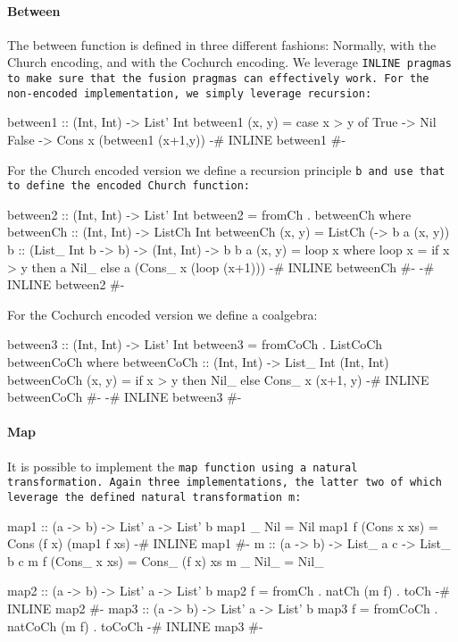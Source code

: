 \paragraph{Between}
The between function is defined in three different fashions: Normally, with the Church encoding, and with the Cochurch encoding.
We leverage \tt{INLINE} pragmas to make sure that the fusion pragmas can effectively work.
For the non-encoded implementation, we simply leverage recursion:
\begin{code}
between1 :: (Int, Int) -> List' Int
between1 (x, y) = case x > y of
  True  -> Nil
  False -> Cons x (between1 (x+1,y))
{-# INLINE between1 #-}
\end{code}
For the Church encoded version we define a recursion principle \tt{b} and use that to define the encoded Church function:
\begin{code}
between2 :: (Int, Int) -> List' Int
between2 = fromCh . betweenCh
  where betweenCh :: (Int, Int) -> ListCh Int
        betweenCh (x, y) = ListCh (\a -> b a (x, y))
        b :: (List_ Int b -> b) -> (Int, Int) -> b
        b a (x, y) = loop x
          where loop x = if x > y
                         then a Nil_
                         else a (Cons_ x (loop (x+1)))
        {-# INLINE betweenCh #-}
{-# INLINE between2 #-}
\end{code}
For the Cochurch encoded version we define a coalgebra:
\begin{code}
between3 :: (Int, Int) -> List' Int
between3 = fromCoCh . ListCoCh betweenCoCh
  where betweenCoCh :: (Int, Int) -> List_ Int (Int, Int)
        betweenCoCh (x, y) = if x > y 
                             then Nil_
                             else Cons_ x (x+1, y)
        {-# INLINE betweenCoCh #-}
{-# INLINE between3 #-}
\end{code}

\paragraph{Map}
It is possible to implement the \tt{map} function using a natural transformation. Again three implementations, the latter two of which leverage the defined natural transformation \tt{m}:
\begin{code}
map1 :: (a -> b) -> List' a -> List' b
map1 _ Nil = Nil
map1 f (Cons x xs) = Cons (f x) (map1 f xs)
{-# INLINE map1 #-}
m :: (a -> b) -> List_ a c -> List_ b c
m f (Cons_ x xs) = Cons_ (f x) xs
m _ Nil_ = Nil_

map2 :: (a -> b) -> List' a -> List' b
map2 f = fromCh . natCh (m f) . toCh
{-# INLINE map2 #-}
map3 :: (a -> b) -> List' a -> List' b
map3 f = fromCoCh . natCoCh (m f) . toCoCh
{-# INLINE map3 #-}
\end{code}
